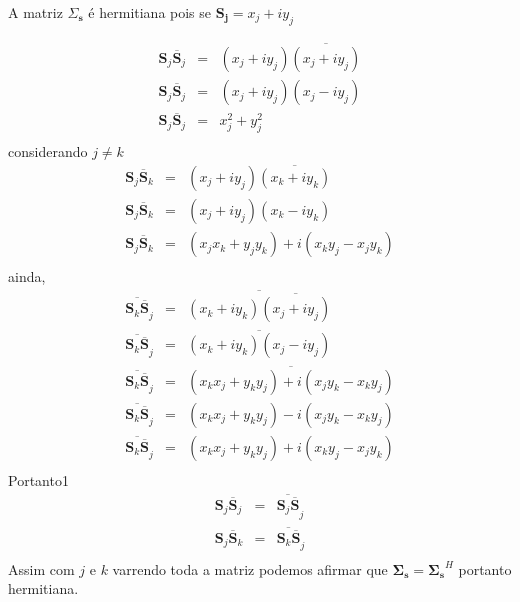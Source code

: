 A matriz {\boldmath$\Sigma_{\mathbf{s}}$} é hermitiana pois se $\mathbf {S_j}= x_j+iy_j $

\begin{equation}\label{eqn3}
\begin{array}{ccc}
\mathbf{S}_j\overline{\mathbf{S}}_j&=& (x_j+iy_j)\overline{(x_j+iy_j)} \\
\mathbf{S}_j\overline{\mathbf{S}}_j&=& (x_j+iy_j)(x_j-iy_j) \\
\mathbf{S}_j\overline{\mathbf{S}}_j&=& x_j^2+y_j^2 \\
\end{array}
\end{equation}
considerando $j \neq k$
\begin{equation}\label{eqn4}
\begin{array}{ccc}
\mathbf{S}_j\overline{\mathbf{S}}_k&=& (x_j+iy_j)\overline{(x_k+iy_k)} \\
\mathbf{S}_j\overline{\mathbf{S}}_k&=& (x_j+iy_j)(x_k-iy_k) \\
\mathbf{S}_j\overline{\mathbf{S}}_k&=& (x_jx_k+y_jy_k)+i(x_ky_j-x_jy_k) \\
\end{array}
\end{equation}
ainda,
\begin{equation}\label{eqn5}
\begin{array}{ccc}
	\overline{\mathbf{S}_k\overline{\mathbf{S}}}_j&=&\overline{ (x_k+iy_k)\overline{(x_j+iy_j)} }\\
	\overline{\mathbf{S}_k\overline{\mathbf{S}}}_j&=&\overline{ (x_k+iy_k)(x_j-iy_j)} \\
	\overline{\mathbf{S}_k\overline{\mathbf{S}}}_j&=&\overline{ (x_kx_j+y_ky_j)+i(x_jy_k-x_ky_j) }\\
	\overline{\mathbf{S}_k\overline{\mathbf{S}}}_j&=&(x_kx_j+y_ky_j)-i(x_jy_k-x_ky_j) \\
	\overline{\mathbf{S}_k\overline{\mathbf{S}}}_j&=&(x_kx_j+y_ky_j)+i(x_ky_j-x_jy_k) \\
\end{array}
\end{equation}
Portanto1
\begin{equation}\label{eqn6}
\begin{array}{ccc}
	\mathbf{S}_j\overline{\mathbf{S}}_j&=&\overline{\mathbf{S}_j\overline{\mathbf {S}}}_j \\
	\mathbf{S}_j\overline{\mathbf{S}}_k&=&\overline{\mathbf{S}_k\overline{\mathbf {S}}}_j \\
\end{array}
\end{equation}
Assim com $j$ e $k$ varrendo toda a matriz podemos afirmar que $\mathbf{\Sigma_{\mathbf{s}}}=\mathbf{\Sigma_{ s}}^H$ portanto hermitiana.


